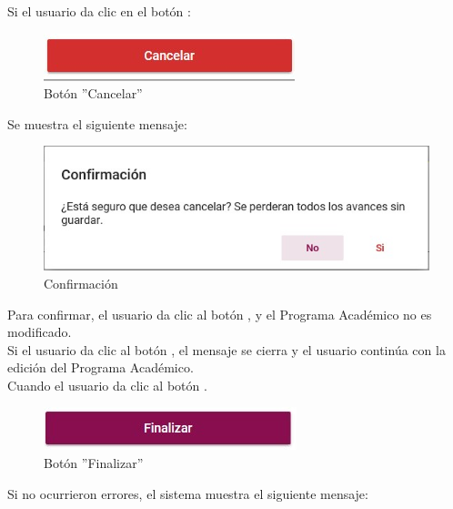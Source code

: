         Si el usuario da clic en el botón :

        \begin{figure}[H]
            \centering
            \hypertarget{cancel2}{\includegraphics[width=0.7\linewidth]{images/SP3/BtnCancelar}}
            \caption{Botón ''Cancelar''}
            \label{cancel2}
        \end{figure}

       Se muestra el siguiente mensaje:
        \begin{figure}[H]
            \centering
            \hypertarget{confirmar}{\includegraphics[width=0.7\linewidth]{images/SP3/Confirmacion}}
            \caption{Confirmación}
            \label{confirmar}
        \end{figure}

        Para confirmar, el usuario da clic al botón , y el Programa Académico no es modificado.\\

        Si el usuario da clic al botón , el mensaje se cierra y el usuario continúa con la edición del Programa Académico.\\

        Cuando el usuario da clic al botón .
        \begin{figure}[H]
            \centering
            \hypertarget{btnfin}{\includegraphics[width=0.7\linewidth]{images/SP3/BtnFinalizar}}
            \caption{Botón ''Finalizar''}
            \label{btnfin}
        \end{figure}

        Si no ocurrieron errores, el sistema muestra el siguiente mensaje:

